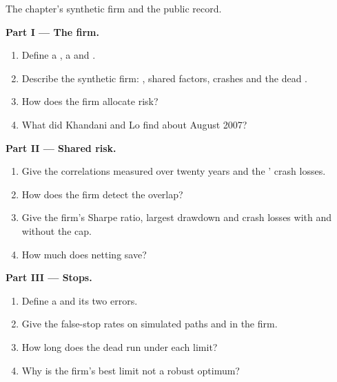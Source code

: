 \begin{problem}\label{pb:s1:running-a-multi-strategy-book:1}
The chapter's synthetic firm and the public record.

\medskip\noindent\textbf{Part I --- The firm.}
\begin{enumerate}
\item Define a , a  and .
\item Describe the synthetic firm: , shared factors, crashes and the dead .
\item How does the firm allocate risk?
\item What did Khandani and Lo find about August 2007?
\end{enumerate}

\medskip\noindent\textbf{Part II --- Shared risk.}
\begin{enumerate}[resume]
\item Give the correlations measured over twenty years and the ' crash losses.
\item How does the firm detect the overlap?
\item Give the firm's Sharpe ratio, largest drawdown and crash losses with and without the cap.
\item How much does netting save?
\end{enumerate}

\medskip\noindent\textbf{Part III --- Stops.}
\begin{enumerate}[resume]
\item Define a  and its two errors.
\item Give the false-stop rates on simulated paths and in the firm.
\item How long does the dead  run under each limit?
\item Why is the firm's best limit not a robust optimum?
\end{enumerate}


\end{problem}
